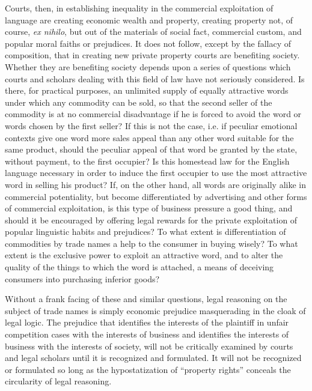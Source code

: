 Courts, then, in establishing inequality in the commercial exploitation of
language are creating economic wealth and property, creating property not, of
course, \textit{ex nihilo}, but out of the materials of social fact, commercial
custom, and popular moral faiths or prejudices. It does not follow, except by
the fallacy of composition, that in creating new private property courts are
benefiting society. Whether they are benefiting society depends upon a series
of questions which courts and scholars dealing with this field of law have not
seriously considered. Is there, for practical purposes, an unlimited supply of
equally attractive words under which any commodity can be sold, so that the
second seller of the commodity is at no commercial disadvantage if he is forced
to avoid the word or words chosen by the first seller? If this is not the case,
i.e. if peculiar emotional contexts give one word more sales appeal than any
other word suitable for the same product, should the peculiar appeal of that
word be granted by the state, without payment, to the first occupier? Is this
homestead law for the English language necessary in order to induce the first
occupier to use the most attractive word in selling his product? If, on the
other hand, all words are originally alike in commercial potentiality, but
become differentiated by advertising and other forms of commercial
exploitation, is this type of business pressure a good thing, and should it be
encouraged by offering legal rewards for the private exploitation of popular
linguistic habits and prejudices? To what extent is differentiation of
commodities by trade names a help to the consumer in buying wisely? To what
extent is the exclusive power to exploit an attractive word, and to alter the
quality of the things to which the word is attached, a means of deceiving
consumers into purchasing inferior goods? 

Without a frank facing of these and similar questions, legal reasoning on the
subject of trade names is simply economic prejudice masquerading in the cloak
of legal logic. The prejudice that identifies the interests of the plaintiff in
unfair competition cases with the interests of business and identifies the
interests of business with the interests of society, will not be critically
examined by courts and legal scholars until it is recognized and formulated. It
will not be recognized or formulated so long as the hypostatization of
``property rights'' conceals the circularity of legal reasoning.

